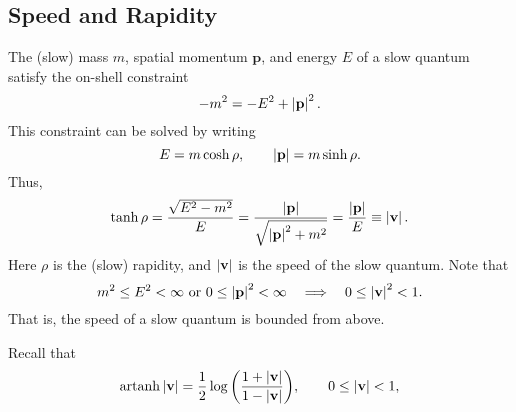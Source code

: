 \subsection{Speed and Rapidity}
The (slow) mass $m$, spatial momentum $\mathbf{p}$, and energy $E$ of a slow quantum satisfy the on-shell constraint
\begin{equation}
	{-m^{2}} = {-E^{2}} + \left\lvert \mathbf{p} \right\rvert^{2}.
\end{equation}
This constraint can be solved by writing
\begin{equation}
	E = m \operatorname{cosh}{\rho}, \qquad \left\lvert \mathbf{p} \right\rvert = m \operatorname{sinh}{\rho}.
\end{equation}
Thus,
\begin{equation}
	\operatorname{tanh}{\rho} = \frac{\sqrt{E^{2} - m^{2}}}{E} = \frac{\left\lvert \mathbf{p} \right\rvert}{\sqrt{\left\lvert \mathbf{p} \right\rvert^{2} + m^{2}}} = \frac{\left\lvert \mathbf{p} \right\rvert}{E} \equiv \left\lvert \mathbf{v} \right\rvert.
\end{equation}
Here $\rho$ is the (slow) rapidity, and $\left\lvert \mathbf{v} \right\rvert$ is the speed of the slow quantum. Note that
\begin{equation}
	m^{2} \leq E^{2} < \infty \text{ or } 0 \leq \left\lvert \mathbf{p} \right\rvert^{2} < \infty \quad \Longrightarrow \quad 0 \leq \left\lvert \mathbf{v} \right\rvert^{2} < 1.
\end{equation}
That is, the speed of a slow quantum is bounded from above.

Recall that
\begin{equation}
	\operatorname{artanh}{\left\lvert \mathbf{v} \right\rvert} = \frac{1}{2} \log{\left( \frac{1 + \left\lvert \mathbf{v} \right\rvert}{1 - \left\lvert \mathbf{v} \right\rvert} \right)}, \qquad 0 \leq \left\lvert \mathbf{v} \right\rvert < 1,
\end{equation}
